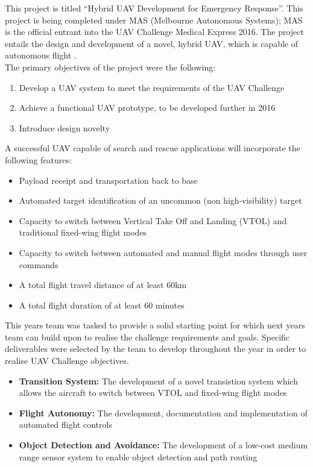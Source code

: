 This project is titled ``Hybrid UAV Development for Emergency Response''. This project is being completed under MAS (Melbourne Autonomous Systems); MAS is the official entrant into the UAV  Challenge Medical Express 2016. \color{red} The project entails the design and development of a novel, hybrid UAV, which is capable of autonomous flight \color{black}. \\

The primary objectives of the project were the following:
\begin{enumerate}
	\item Develop a UAV system to meet the requirements of the UAV Challenge
	\item Achieve a functional UAV prototype, to be developed further in 2016
	\item Introduce design novelty \\
\end{enumerate}

A successful UAV capable of search and rescue applications will incorporate the following features:
\begin{itemize}
	\item Payload receipt and transportation back to base
	\item Automated target identification of an uncommon (non high-visibility) target
	\item Capacity to switch between Vertical Take Off and Landing (VTOL) and traditional fixed-wing flight modes
	\item Capacity to switch between automated and manual flight modes through user commands
	\item A total flight travel distance of at least 60km
	\item A total flight duration of at least 60 minutes\\
\end{itemize}

This years team was tasked to provide a solid starting point for which next years team can build upon to realise the challenge requirements and goals. Specific deliverables were selected by the team to develop throughout the year in order to realise UAV Challenge objectives.
\begin{itemize}
	\item \textbf{Transition System:} The development of a novel transistion system which allows the aircraft to switch between VTOL and fixed-wing flight modes
	\item \textbf{Flight Autonomy:} The development, documentation and implementation of automated flight controls
	\item \textbf{Object Detection and Avoidance:} The development of a low-cost medium range sensor system to enable object detection and path routing
\end{itemize}

